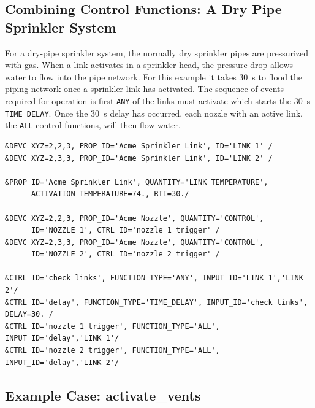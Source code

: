 \documentclass[11pt]{book}
\newcommand{\ct}{\tt\small}
\begin{document}
\subsection{Combining Control Functions: A Dry Pipe Sprinkler System}
\label{info:dry_pipe}

For a dry-pipe sprinkler system, the normally
dry sprinkler pipes are pressurized with gas.  When a link activates in a sprinkler head, the pressure drop allows
water to flow into the pipe network.  For this example it takes 30~s to flood the piping network once a sprinkler link
has activated.  The sequence of events required for operation is first {\ct ANY} of the links must activate which
starts the 30~s {\ct TIME\_DELAY}.  Once the 30~s delay has occurred, each nozzle with an active link, the {\ct ALL}
control functions, will then flow water.

\footnotesize
\begin{verbatim}
&DEVC XYZ=2,2,3, PROP_ID='Acme Sprinkler Link', ID='LINK 1' /
&DEVC XYZ=2,3,3, PROP_ID='Acme Sprinkler Link', ID='LINK 2' /

&PROP ID='Acme Sprinkler Link', QUANTITY='LINK TEMPERATURE',
      ACTIVATION_TEMPERATURE=74., RTI=30./

&DEVC XYZ=2,2,3, PROP_ID='Acme Nozzle', QUANTITY='CONTROL',
      ID='NOZZLE 1', CTRL_ID='nozzle 1 trigger' /
&DEVC XYZ=2,3,3, PROP_ID='Acme Nozzle', QUANTITY='CONTROL',
      ID='NOZZLE 2', CTRL_ID='nozzle 2 trigger' /

&CTRL ID='check links', FUNCTION_TYPE='ANY', INPUT_ID='LINK 1','LINK 2'/
&CTRL ID='delay', FUNCTION_TYPE='TIME_DELAY', INPUT_ID='check links', DELAY=30. /
&CTRL ID='nozzle 1 trigger', FUNCTION_TYPE='ALL', INPUT_ID='delay','LINK 1'/
&CTRL ID='nozzle 2 trigger', FUNCTION_TYPE='ALL', INPUT_ID='delay','LINK 2'/
\end{verbatim}
\normalsize


\subsection{Example Case: activate\_vents}
\end{document}
